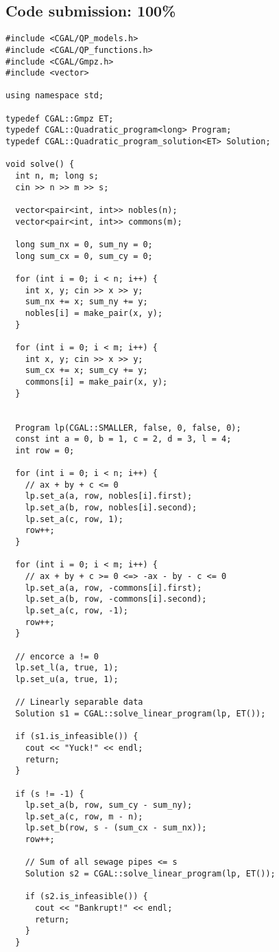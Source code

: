 \documentclass[12pt,letterpaper]{article}
\begin{document}
\small
\subsection*{Code submission: 100\%}
\begin{verbatim}
#include <CGAL/QP_models.h>
#include <CGAL/QP_functions.h>
#include <CGAL/Gmpz.h>
#include <vector>

using namespace std;

typedef CGAL::Gmpz ET;
typedef CGAL::Quadratic_program<long> Program;
typedef CGAL::Quadratic_program_solution<ET> Solution;

void solve() {
  int n, m; long s;
  cin >> n >> m >> s;
  
  vector<pair<int, int>> nobles(n);
  vector<pair<int, int>> commons(m);
  
  long sum_nx = 0, sum_ny = 0;
  long sum_cx = 0, sum_cy = 0;
  
  for (int i = 0; i < n; i++) {
    int x, y; cin >> x >> y;
    sum_nx += x; sum_ny += y;
    nobles[i] = make_pair(x, y);
  }
  
  for (int i = 0; i < m; i++) {
    int x, y; cin >> x >> y;
    sum_cx += x; sum_cy += y;
    commons[i] = make_pair(x, y);
  }
  
  
  Program lp(CGAL::SMALLER, false, 0, false, 0);
  const int a = 0, b = 1, c = 2, d = 3, l = 4;
  int row = 0;
  
  for (int i = 0; i < n; i++) {
    // ax + by + c <= 0
    lp.set_a(a, row, nobles[i].first);
    lp.set_a(b, row, nobles[i].second);
    lp.set_a(c, row, 1);
    row++;
  }
  
  for (int i = 0; i < m; i++) {
    // ax + by + c >= 0 <=> -ax - by - c <= 0
    lp.set_a(a, row, -commons[i].first);
    lp.set_a(b, row, -commons[i].second);
    lp.set_a(c, row, -1);
    row++;
  }
  
  // encorce a != 0
  lp.set_l(a, true, 1);
  lp.set_u(a, true, 1);
  
  // Linearly separable data
  Solution s1 = CGAL::solve_linear_program(lp, ET());
  
  if (s1.is_infeasible()) { 
    cout << "Yuck!" << endl;
    return;
  }
  
  if (s != -1) {
    lp.set_a(b, row, sum_cy - sum_ny);
    lp.set_a(c, row, m - n);
    lp.set_b(row, s - (sum_cx - sum_nx));
    row++;
    
    // Sum of all sewage pipes <= s
    Solution s2 = CGAL::solve_linear_program(lp, ET());

    if (s2.is_infeasible()) {
      cout << "Bankrupt!" << endl;
      return;
    }
  }
  

\end{verbatim}
\end{document}
